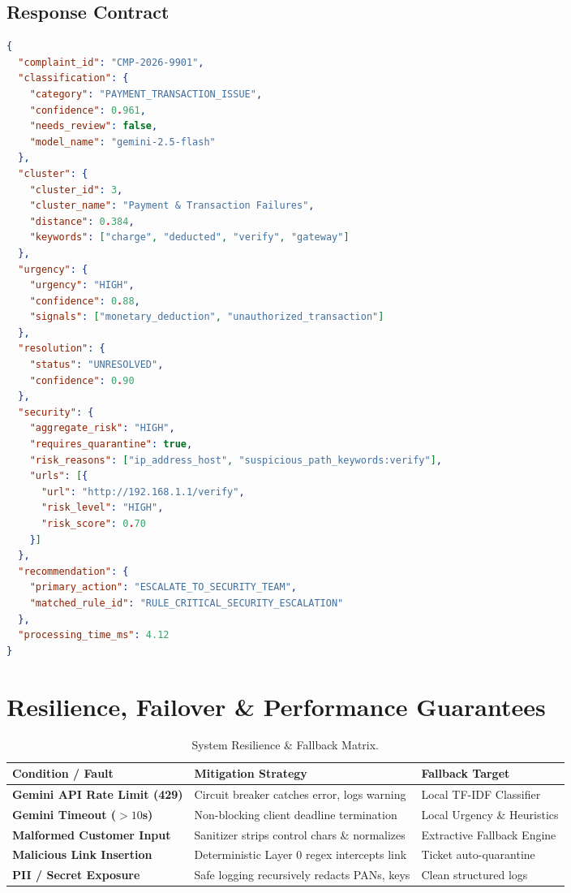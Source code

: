 \documentclass[11pt,a4paper]{article}
\begin{document}
\subsection{Response Contract}
\begin{lstlisting}[language=json]
{
  "complaint_id": "CMP-2026-9901",
  "classification": {
    "category": "PAYMENT_TRANSACTION_ISSUE",
    "confidence": 0.961,
    "needs_review": false,
    "model_name": "gemini-2.5-flash"
  },
  "cluster": {
    "cluster_id": 3,
    "cluster_name": "Payment & Transaction Failures",
    "distance": 0.384,
    "keywords": ["charge", "deducted", "verify", "gateway"]
  },
  "urgency": {
    "urgency": "HIGH",
    "confidence": 0.88,
    "signals": ["monetary_deduction", "unauthorized_transaction"]
  },
  "resolution": {
    "status": "UNRESOLVED",
    "confidence": 0.90
  },
  "security": {
    "aggregate_risk": "HIGH",
    "requires_quarantine": true,
    "risk_reasons": ["ip_address_host", "suspicious_path_keywords:verify"],
    "urls": [{
      "url": "http://192.168.1.1/verify",
      "risk_level": "HIGH",
      "risk_score": 0.70
    }]
  },
  "recommendation": {
    "primary_action": "ESCALATE_TO_SECURITY_TEAM",
    "matched_rule_id": "RULE_CRITICAL_SECURITY_ESCALATION"
  },
  "processing_time_ms": 4.12
}
\end{lstlisting}

\section{Resilience, Failover \& Performance Guarantees}

\begin{table}[htbp]
\centering
\small
\begin{tabularx}{\linewidth}{l X l}
\toprule
\textbf{Condition / Fault} & \textbf{Mitigation Strategy} & \textbf{Fallback Target} \\
\midrule
\textbf{Gemini API Rate Limit (429)} & Circuit breaker catches error, logs warning & Local TF-IDF Classifier \\
\textbf{Gemini Timeout ($> 10$s)} & Non-blocking client deadline termination & Local Urgency \& Heuristics \\
\textbf{Malformed Customer Input} & Sanitizer strips control chars \& normalizes & Extractive Fallback Engine \\
\textbf{Malicious Link Insertion} & Deterministic Layer 0 regex intercepts link & Ticket auto-quarantine \\
\textbf{PII / Secret Exposure} & Safe logging recursively redacts PANs, keys & Clean structured logs \\
\bottomrule
\end{tabularx}
\caption{System Resilience \& Fallback Matrix.}
\label{tab:resilience}
\end{table}
\end{document}
